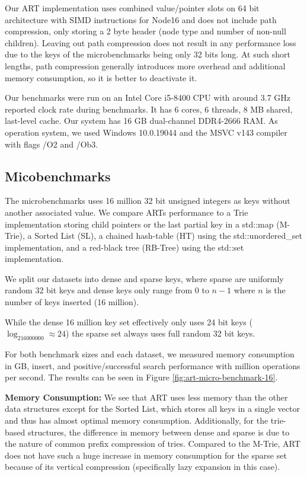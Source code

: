 \documentclass[acmtog, nonacm]{acmart}
\begin{document}
Our ART implementation \cite{fritschart} uses combined value/pointer slots on 64 bit architecture with SIMD instructions for Node16 
and does not include path compression, only storing a 2 byte header (node type and number of non-null children).
Leaving out path compression does not result in any performance loss due to the keys of the microbenchmarks
being only 32 bits long. At such short lengths, path compression generally introduces more overhead and 
additional memory consumption, so it is better to deactivate it.

Our benchmarks were run on an Intel Core i5-8400 CPU with around 3.7 GHz reported clock rate during benchmarks.
It has 6 cores, 6 threads, 8 MB shared, last-level cache. Our system has 16 GB dual-channel DDR4-2666 RAM. As operation system, we used Windows 10.0.19044 and the MSVC v143 compiler with flags /O2 and /Ob3.

\subsection{Micobenchmarks}

The microbenchmarks uses 16 million 32 bit unsigned integers as keys without another associated value. We compare ARTs 
performance to a Trie implementation storing child pointers or the last partial key in a std::map (M-Trie), a 
Sorted List (SL), a chained hash-table (HT) using the std::unordered\_set implementation, and a red-black tree 
(RB-Tree) using the std::set implementation.

We split our datasets into dense and sparse keys, where sparse are uniformly random 32 bit keys and dense keys only
range from $0$ to $n-1$ where $n$ is the number of keys inserted (16 million).

While the dense 16 million key set effectively only uses 24 bit keys ($\log_216000000\approx24$)
the sparse set always uses full random 32 bit keys.

For both benchmark sizes and each dataset, we measured memory consumption in GB, insert, and positive/successful search performance with million operations per second. 
The results can be seen in Figure \ref{fig:art-micro-benchmark-16}.

\textbf{Memory Consumption:} We see that ART uses less memory than the other data structures except for the Sorted List, which stores all keys in a single vector and thus has almost optimal memory consumption. Additionally, for the 
trie-based structures, the difference in memory between dense and sparse is due to the nature of common prefix
compression of tries. Compared to the M-Trie, ART does not have such a huge increase in memory consumption for the sparse set
because of its vertical compression (specifically lazy expansion in this case).
\end{document}
